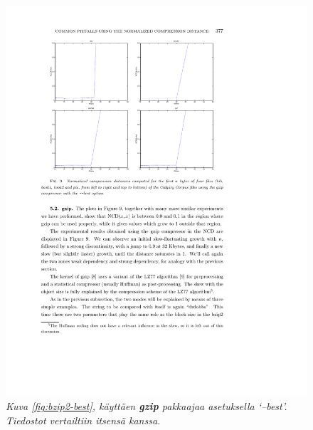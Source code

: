 \documentclass[12pt,finnish,final]{tktltiki2}
\theoremstyle{definition}
\theoremstyle{remark}
\begin{document}
    \begin{figure}[tb]
      \includegraphics[width=\textwidth]{img/gzip-best}
      \caption{\emph{Kuva \ref{fig:bzip2-best}, käyttäen \textbf{gzip} pakkaajaa asetuksella `--best'. Tiedostot vertailtiin itsensä kanssa.} \cite{cebrian2005common}}
      \label{fig:gzip-best}
    \end{figure}
\end{document}
